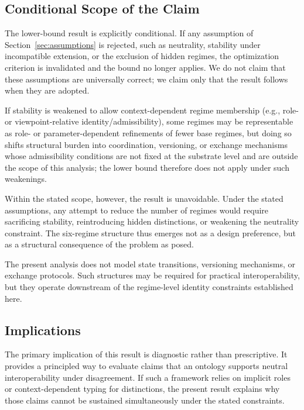 \subsection{Conditional Scope of the Claim}

The lower-bound result is explicitly conditional.
If any assumption of Section~\ref{sec:assumptions} is rejected,
such as neutrality, stability under incompatible extension,
or the exclusion of hidden regimes,
the optimization criterion is invalidated
and the bound no longer applies.
We do not claim that these assumptions are universally correct;
we claim only that the result follows when they are adopted.

If stability is weakened to allow context-dependent
regime membership (e.g., role- or viewpoint-relative identity/admissibility),
some regimes may be representable as
role- or parameter-dependent refinements of fewer base regimes,
but doing so shifts structural burden into
coordination, versioning, or exchange mechanisms
whose admissibility conditions are not fixed
at the substrate level and are outside the scope of this analysis;
the lower bound therefore does not apply under such weakenings.

Within the stated scope, however, the result is unavoidable.
Under the stated assumptions, any attempt to reduce the number of regimes
would require sacrificing stability,
reintroducing hidden distinctions, or weakening the neutrality constraint.
The six-regime structure thus emerges not as a design preference, but as a
structural consequence of the problem as posed.

The present analysis does not model state transitions,
versioning mechanisms, or exchange protocols.
Such structures may be required for practical interoperability,
but they operate downstream of the regime-level identity constraints
established here.

\subsection{Implications}

The primary implication of this result is diagnostic rather than
prescriptive.
It provides a principled way to evaluate claims that an ontology supports
neutral interoperability under disagreement.
If such a framework relies on implicit roles or context-dependent typing
for \stabilitycritical{} distinctions, the present result explains why those
claims cannot be sustained simultaneously under the stated constraints.

